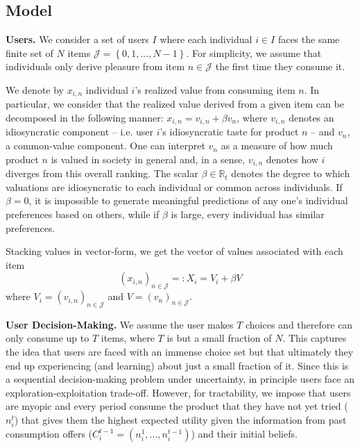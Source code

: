 \documentclass[sigconf]{acmart}
\begin{document}
\subsection{Model}
\par
\noindent \textbf{Users.} We consider a set of users $I$ where each individual $i \in I$ faces the same finite set of $N$ items $\mathcal J = \left\{0,1,...,N-1\right\}$. For simplicity, we assume that individuals only derive pleasure from item $n \in \mathcal{J}$ the first time they consume it.
\par

We denote by $x_{i,n}$ individual $i$'s realized value from consuming item $n$. In particular, we consider that the realized value derived from a given item can be decomposed in the following manner: $x_{i,n}= v_{i,n} + \beta v_n$, where $v_{i,n}$ denotes an idiosyncratic component -- i.e. user $i$'s idiosyncratic taste for product $n$ --  and $v_{n}$, a common-value component. One can interpret $v_n$ as a measure of how much product $n$ is valued in society in general and, in a sense, $v_{i,n}$ denotes how $i$ diverges from this overall ranking. The scalar $\beta \in \mathbb{R}_{t}$ denotes the degree to which valuations are idiosyncratic to each individual or common across individuals. If $\beta=0$, it is impossible to generate meaningful predictions of any one's individual preferences based on others, while if $\beta$ is large, every individual has similar preferences.
\par
Stacking values in vector-form, we get the vector of values associated with each item 
$${\left(x_{i,n}\right)}_{n \in \mathcal{J}}=:X_i =V_i+ \beta V $$
where $V_i ={\left(v_{i,n}\right)}_{n \in \mathcal{J}}$ and $V={\left(v_{n}\right)}_{n \in \mathcal{J}}$.
\par
\noindent\textbf{User Decision-Making.}
We assume the user makes $T$ choices and therefore can only consume up to $T$ items, where $T$ is but a small fraction of $N$. This captures the idea that users are faced with an immense choice set but that ultimately they end up experiencing (and learning) about just a small fraction of it. Since this is a sequential decision-making problem under uncertainty, in principle users face an exploration-exploitation trade-off. However, for tractability, we impose that users are myopic and every period consume the product that they have not yet tried ($n_i^t$) that gives them the highest expected utility given the information from past consumption offers ($C_i^{t-1}=(n_i^1,...,n_i^{t-1})$) and their initial beliefs.
\end{document}
